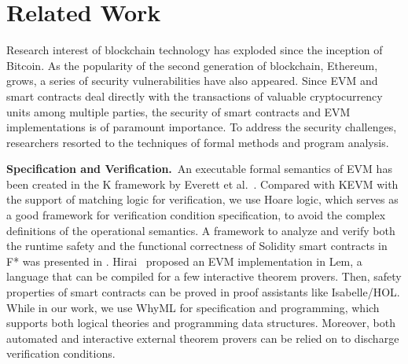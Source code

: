 \documentclass[runningheads]{llncs}
\begin{document}
\section{Related Work}\label{Sec: Related}

Research interest of blockchain technology has exploded since the inception of Bitcoin. As the popularity of the second generation of blockchain, 
Ethereum, grows, a series of security vulnerabilities have also appeared. 
Since EVM and smart contracts deal directly with the transactions of valuable cryptocurrency units among multiple parties, 
the security of smart contracts and EVM implementations is of paramount importance. To address the security challenges, 
researchers resorted to the techniques of formal methods and program analysis. 

\noindent\textbf{Specification and Verification.}~An executable formal semantics of EVM has been 
created in the K framework by Everett et al.~\cite{hildenbrandt2017kevm}. 
Compared with KEVM with the support
of matching logic for verification, we use Hoare logic, which serves as a good framework for
verification condition specification, to avoid the complex definitions
of the operational semantics. 
A framework to analyze and verify both the runtime safety and the functional correctness of 
Solidity smart contracts in F*
was presented in \cite{bhargavan2016formal}.
Hirai~\cite{hirai2017defining} proposed an EVM implementation in Lem, a language that can be compiled for 
a few interactive theorem provers. Then, safety properties of smart contracts can be proved in proof assistants like Isabelle/HOL.
While in our work, we use WhyML for specification and programming, which supports both logical theories 
and programming data structures. Moreover, both automated and interactive external theorem provers 
can be relied on to discharge verification conditions. 
\end{document}

